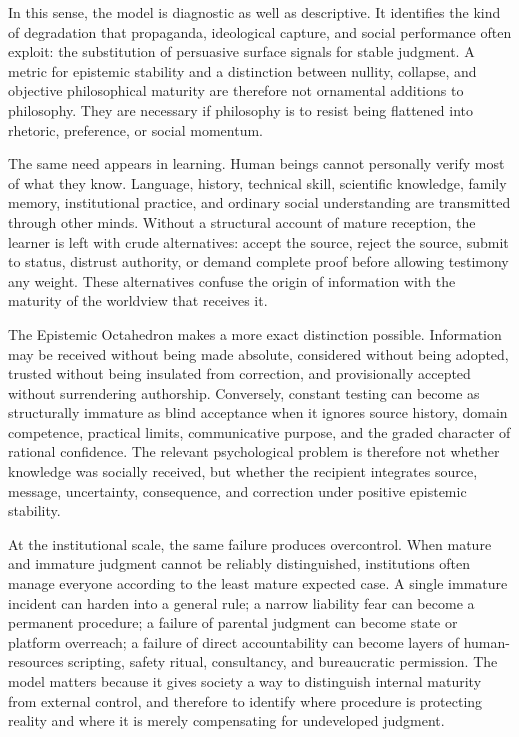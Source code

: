 \documentclass[11pt]{article}
\begin{document}
In this sense, the model is diagnostic as well as descriptive. It identifies the kind of degradation that propaganda, ideological capture, and social performance often exploit: the substitution of persuasive surface signals for stable judgment. A metric for epistemic stability and a distinction between nullity, collapse, and objective philosophical maturity are therefore not ornamental additions to philosophy. They are necessary if philosophy is to resist being flattened into rhetoric, preference, or social momentum.

The same need appears in learning. Human beings cannot personally verify most of what they know. Language, history, technical skill, scientific knowledge, family memory, institutional practice, and ordinary social understanding are transmitted through other minds. Without a structural account of mature reception, the learner is left with crude alternatives: accept the source, reject the source, submit to status, distrust authority, or demand complete proof before allowing testimony any weight. These alternatives confuse the origin of information with the maturity of the worldview that receives it.

The Epistemic Octahedron makes a more exact distinction possible. Information may be received without being made absolute, considered without being adopted, trusted without being insulated from correction, and provisionally accepted without surrendering authorship. Conversely, constant testing can become as structurally immature as blind acceptance when it ignores source history, domain competence, practical limits, communicative purpose, and the graded character of rational confidence. The relevant psychological problem is therefore not whether knowledge was socially received, but whether the recipient integrates source, message, uncertainty, consequence, and correction under positive epistemic stability.

At the institutional scale, the same failure produces overcontrol. When mature and immature judgment cannot be reliably distinguished, institutions often manage everyone according to the least mature expected case. A single immature incident can harden into a general rule; a narrow liability fear can become a permanent procedure; a failure of parental judgment can become state or platform overreach; a failure of direct accountability can become layers of human-resources scripting, safety ritual, consultancy, and bureaucratic permission. The model matters because it gives society a way to distinguish internal maturity from external control, and therefore to identify where procedure is protecting reality and where it is merely compensating for undeveloped judgment.
\end{document}
